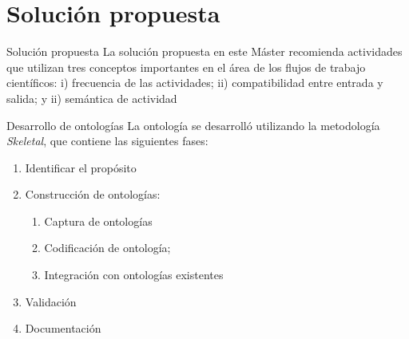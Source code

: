 \section{Solución propuesta}

\begin{frame}		
	\begin{block}{Solución propuesta}
		La solución propuesta en este Máster recomienda actividades que utilizan tres conceptos importantes en el área de los flujos de trabajo científicos: i) frecuencia de las actividades; ii) compatibilidad entre entrada y salida; y ii) semántica de actividad
	\end{block}
\end{frame}


\begin{frame}		
	\begin{block}{Desarrollo de ontologías}
		La ontología se desarrolló utilizando la metodología \emph{Skeletal}, que contiene las siguientes fases:
		\begin{enumerate}
			\item Identificar el propósito
			\item Construcción de ontologías:
			\begin{enumerate}
				\item Captura de ontologías
				\item Codificación de ontología;
				\item Integración con ontologías existentes
			\end{enumerate}
			\item Validación
			\item Documentación
		\end{enumerate}
	\end{block}
\end{frame}


